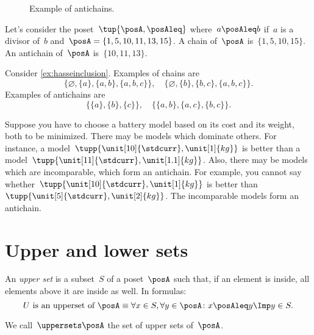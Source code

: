 \begin{figure}[h!]
  \begin{center}
  \end{center}
  \caption{Example of antichains. }
  \label{fig:antichain}
\end{figure}


\begin{example}
  Let's consider the poset~$\tup{\posA,\posAleq}$ where~$a\posAleq b$ if~$a$ is a divisor of~$b$ and~$\posA=\{1,5,10,11,13,15\}$. A chain of~$\posA$ is~$\{1,5,10,15\}$. An antichain of~$\posA$ is~$\{10,11,13\}$.
\end{example}

\begin{example}
  Consider \cref{ex:hasseinclusion}. Examples of chains are
  \begin{equation}
    \{\varnothing,\{a\},\{a,b\},\{a,b,c\}\}, \quad  \{\varnothing,\{b\},\{b,c\},\{a,b,c\}\}.
  \end{equation}
  Examples of antichains are
  \begin{equation}
    \{\{a\},\{b\},\{c\}\}, \quad \{ \{a,b\},\{a,c\}, \{b,c\}\}.
  \end{equation}
\end{example}

\begin{example}
  \label{ex:battery}
  Suppose you have to choose a battery model based on its cost and its weight, both to be minimized.
  There may be models which dominate others.
  For instance, a model~$\tupp{\unit[10]{\stdcurr},\unit[1]{kg}}$ is better than a model~$\tupp{\unit[11]{\stdcurr},\unit[1.1]{kg}}$.
  Also, there may be models which are incomparable, which form an antichain.
  For example, you cannot say whether~$\tupp{\unit[10]{\stdcurr},\unit[1]{kg}}$ is better than~$\tupp{\unit[5]{\stdcurr},\unit[2]{kg}}$. The incomparable models form an antichain.
\end{example}


\section{Upper and lower sets}

\begin{definition}
  \label{def:upperset}
  An \emph{upper set} is a subset~$S$ of a poset~$\posA$ such
  that, if an element is inside, all elements above it are inside as well.
  In formulas:
  \begin{equation}
    \text{$U$ is an upperset of $\posA$} \equiv \forall x\in S, \forall y\in \posA \colon x\posAleq y \Imp y\in S.
  \end{equation}
\end{definition}
We call~$\uppersets \posA$ the set of upper sets of~$\posA$.

